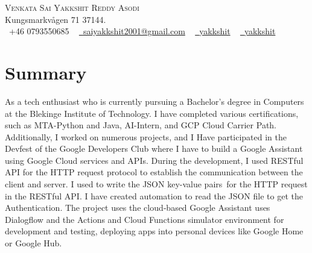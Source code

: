 \documentclass[letterpaper,11pt]{article}
\begin{document}

\begin{center}
    {\Huge \scshape Venkata Sai Yakkshit Reddy Asodi}~\href{https://www.cedzlabs.com/yakkshit}{\vspace{1pt}}\\
    Kungsmarkvågen 71 37144. \\ \vspace{1pt}
    \small \raisebox{-0.1\height}\faPhone\ +46 0793550685 ~ \href{mailto:saiyakkshit2001@gmail.com}{\raisebox{-0.2\height}\faEnvelope\  {saiyakkshit2001@gmail.com}} ~ 
    \href{https://linkedin.com/in/yakkshit/}{\raisebox{-0.2\height}\faLinkedin\ {yakkshit}}  ~
    \href{https://cedzlabs.com/yakkshit}{\raisebox{-0.2\height}\faRss\ {yakkshit}}  ~
    \href{https://github.com/saiyakkshit}{\raisebox{-0.2\height}}
    \vspace{-8pt}
\end{center}
\section{Summary}
As a tech enthusiast who is currently pursuing a Bachelor’s degree in Computers at the Blekinge Institute of Technology. I have completed various certifications, such as MTA-Python and Java, AI-Intern, and GCP Cloud Carrier Path. Additionally, I worked on numerous projects, and I Have participated in the Devfest of the Google Developers Club where I have to build a Google Assistant using Google Cloud services and APIs.
During the development, I used RESTful API for the HTTP request protocol to establish the communication between the client and server. I used to write the JSON key-value pairs for the HTTP request in the RESTful API. I have created automation to read the JSON file to get the Authentication. The project uses the cloud‑based Google Assistant uses Dialogflow and the Actions and Cloud Functions simulator environment for development and testing, deploying apps into personal devices like Google Home or Google Hub.
\end{document}

